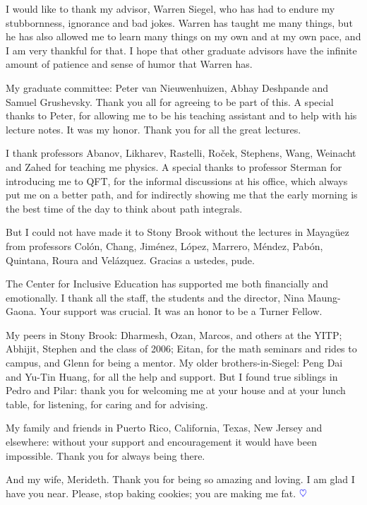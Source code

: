 \begin{acknowledgements}
I would like to thank my advisor, Warren Siegel, who has had to endure my stubbornness, ignorance and bad jokes. Warren has taught me many things, but he has also allowed me to learn many things on my own and at my own pace, and I am very thankful for that. I hope that other graduate advisors have the infinite amount of patience and sense of humor that Warren has.

My graduate committee: Peter van Nieuwenhuizen, Abhay Deshpande and Samuel Grushevsky. Thank you all for agreeing to be part of this. A special thanks to Peter, for allowing me to be his teaching assistant and to help with his lecture notes. It was my honor. Thank you for all the great lectures.

I thank professors Abanov, Likharev, Rastelli, Ro\v{c}ek, Stephens, Wang, Weinacht and Zahed for teaching me physics. A special thanks to professor Sterman for introducing me to QFT, for the informal discussions at his office, which always put me on a better path, and for indirectly showing me that the early morning is the best time of the day to think about path integrals.

But I could not have made it to Stony Brook without the lectures in Mayag\"{u}ez from professors Col\'{o}n, Chang, Jim\'{e}nez, L\'{o}pez, Marrero, M\'{e}ndez, Pab\'{o}n, Quintana, Roura and Vel\'{a}zquez. Gracias a ustedes, pude.

The Center for Inclusive Education has supported me both financially and emotionally. I thank all the staff, the students and the director, Nina Maung-Gaona. Your support was crucial. It was an honor to be a Turner Fellow.

My peers in Stony Brook: Dharmesh, Ozan, Marcos, and others at the YITP; Abhijit, Stephen and the class of 2006; Eitan, for the math seminars and rides to campus, and Glenn for being a mentor. My older brothers-in-Siegel: Peng Dai and Yu-Tin Huang, for all the help and support. But I found true siblings in Pedro and Pilar: thank you for welcoming me at your house and at your lunch table, for listening, for caring and for advising.

My family and friends in Puerto Rico, California, Texas, New Jersey and elsewhere: without your support and encouragement it would have been impossible. Thank you for always being there.

And my wife, Merideth. Thank you for being so amazing and loving. I am glad I have you near. Please, stop baking cookies; you are making me fat. ${\color{blue} \heartsuit}$
\end{acknowledgements}